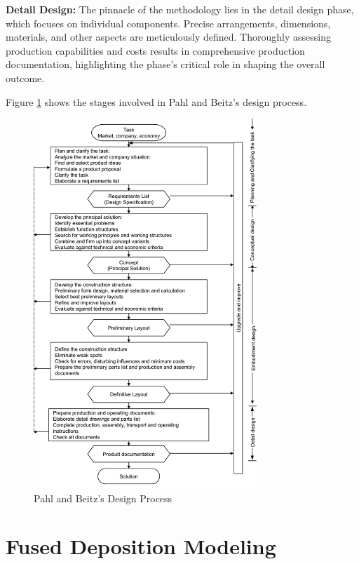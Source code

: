\textbf{Detail Design:} The pinnacle of the methodology lies in the detail design phase, which focuses on individual components. Precise arrangements, dimensions, materials, and other aspects are meticulously defined. Thoroughly assessing production capabilities and costs results in comprehensive production documentation, highlighting the phase's critical role in shaping the overall outcome.

Figure \ref{fig:pahlprocess} shows the stages involved in Pahl and Beitz's design process.

\begin{figure}[ht!]
  \centering
  \includegraphics[width=0.75\textwidth]{texs/Part1/chapter1/image/pahlprocess.png}
  \caption{Pahl and Beitz's Design Process \cite{Pahl07l}}
  \label{fig:pahlprocess}
\end{figure}

\section{Fused Deposition Modeling}
\label{sec:fused_deposition_modeling}

